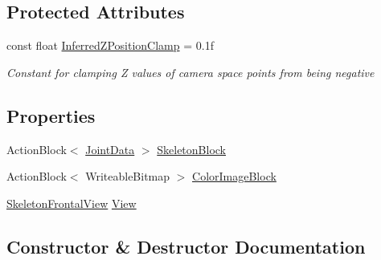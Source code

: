 \subsection*{Protected Attributes}
\begin{DoxyCompactItemize}
\item 
const float \hyperlink{class_rowing_monitor_1_1_model_1_1_pipeline_1_1_skeleton_frontal_display_a4d83794bd1edce81b5162cf7389485a3}{Inferred\+Z\+Position\+Clamp} = 0.\+1f
\begin{DoxyCompactList}\small\item\em Constant for clamping Z values of camera space points from being negative \end{DoxyCompactList}\end{DoxyCompactItemize}
\subsection*{Properties}
\begin{DoxyCompactItemize}
\item 
Action\+Block$<$ \hyperlink{struct_rowing_monitor_1_1_model_1_1_util_1_1_joint_data}{Joint\+Data} $>$ \hyperlink{class_rowing_monitor_1_1_model_1_1_pipeline_1_1_skeleton_frontal_display_ad010abf35902ed0b8bb6ded6a2f6a395}{Skeleton\+Block}
\item 
Action\+Block$<$ Writeable\+Bitmap $>$ \hyperlink{class_rowing_monitor_1_1_model_1_1_pipeline_1_1_skeleton_frontal_display_a1bc8a2facef1ae045fea7c21c637e6ee}{Color\+Image\+Block}
\item 
\hyperlink{class_rowing_monitor_1_1_view_1_1_skeleton_frontal_view}{Skeleton\+Frontal\+View} \hyperlink{class_rowing_monitor_1_1_model_1_1_pipeline_1_1_skeleton_frontal_display_a8be39be7a7348b853f17e4fbd59e8530}{View}
\end{DoxyCompactItemize}


\subsection{Constructor \& Destructor Documentation}
\mbox{\label{class_rowing_monitor_1_1_model_1_1_pipeline_1_1_skeleton_frontal_display_afd21a93370aa49b931f002d9e035426a}} 
